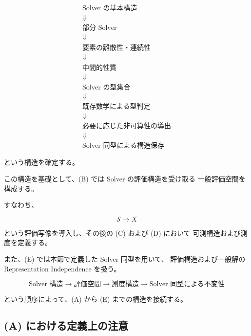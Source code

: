 \documentclass[a4paper,11pt]{article}
\newcommand{\Solver}{\mathcal{S}}
\begin{document}
\begin{equation}
    \boxed{
    \begin{array}{c}
    \text{Solver の基本構造}\\
    \Downarrow\\
    \text{部分 Solver}\\
    \Downarrow\\
    \text{要素の離散性・連続性}\\
    \Downarrow\\
    \text{中間的性質}\\
    \Downarrow\\
    \text{Solver の型集合}\\
    \Downarrow\\
    \text{既存数学による型判定}\\
    \Downarrow\\
    \text{必要に応じた非可算性の導出}\\
    \Downarrow\\
    \text{Solver 同型による構造保存}
    \end{array}
    }
    \label{eq:A-structure-summary}
\end{equation}

という構造を確定する。

この構造を基礎として、(B) では Solver の評価構造を受け取る
一般評価空間を構成する。

すなわち、

\begin{equation}
    \Solver
    \longrightarrow
    X
\end{equation}

という評価写像を導入し、その後の (C) および (D) において
可測構造および測度を定義する。

また、(E) では本節で定義した Solver 同型を用いて、
評価構造および一般解の Representation Independence を扱う。

\begin{equation}
    \boxed{
    \text{Solver 構造}
    \longrightarrow
    \text{評価空間}
    \longrightarrow
    \text{測度構造}
    \longrightarrow
    \text{Solver 同型による不変性}
    }
    \label{eq:A-to-E}
\end{equation}

という順序によって、(A) から (E) までの構造を接続する。


\subsection*{(A) における定義上の注意}
\end{document}
